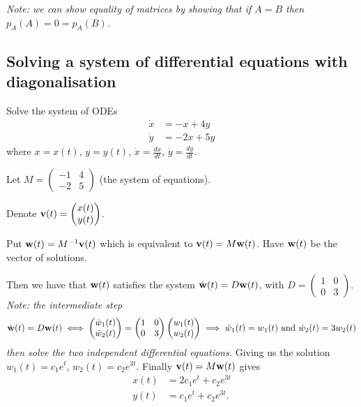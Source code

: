 \documentclass[10pt, a4paper]{article}
\begin{document}
\textit{Note:
we can show equality of matrices by showing that if $A = B$ then $p_A(A) = 0 = p_A(B)$.}

\subsection{Solving a system of differential equations with diagonalisation}

\begin{example}
    Solve the system of ODEs
    \begin{align*}
        \dot{x} &= -x + 4y \\
        \dot{y} &= -2x + 5y
    \end{align*}
    where $x = x(t)$,
    $y = y(t)$,
    $\dot{x} = \frac{dx}{dt}$,
    $\dot{y} = \frac{dy}{dt}$.

    \begin{solution}
        Let $M = \begin{pmatrix}
            -1 & 4 \\ -2 & 5
        \end{pmatrix}$
        (the system of equations).
        
        Denote $\mathbf{v}(t) = \begin{pmatrix}
            x(t) \\ y(t)
        \end{pmatrix}$.

        Put $\mathbf{w}(t) = M ^ {-1}\mathbf{v}(t)$ which is equivalent to $\mathbf{v}(t) = M\mathbf{w}(t)$.
        Have $\mathbf{w}(t)$ be the vector of solutions.
        
        Then we have that $\mathbf{w}(t)$ satisfies the system $\dot{\mathbf{w}}(t) = D\mathbf{w}(t)$,
        with $D = \begin{pmatrix}
            1 & 0 \\ 0 & 3
        \end{pmatrix}$.
        \textit{Note:
        the intermediate step
        \[
        \dot{\mathbf{w}}(t) = D\mathbf{w}(t) \iff \begin{pmatrix}
            \dot{w}_1(t) \\ \dot{w}_2(t)
        \end{pmatrix} = \begin{pmatrix}
            1 & 0 \\ 0 & 3
        \end{pmatrix}\begin{pmatrix}
            w_1(t) \\ w_2(t)
        \end{pmatrix} \implies \dot{w}_1(t) = w_1(t) \text{ and } \dot{w}_2(t) = 3w_2(t)
        \]
        then solve the two independent differential equations.}
        Giving us the solution $w_1(t) = c_1e ^ t$,
        $w_2(t) = c_2e ^ {3t}$.
        Finally $\mathbf{v}(t) = M\mathbf{w}(t)$ gives
        \begin{align*}
            x(t) &= 2c_1e ^ t + c_2e ^ {3t} \\
            y(t) &= c_1e ^ t + c_2e ^ {3t}.
        \end{align*}
    \end{solution}
\end{example}
\end{document}
